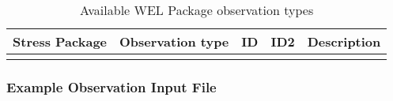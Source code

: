 \begin{longtable}{p{2cm} p{2.75cm} p{2cm} p{1.25cm} p{7cm}}
\caption{Available WEL Package observation types} \tabularnewline

\hline
\hline
\textbf{Stress Package} & \textbf{Observation type} & \textbf{ID} & \textbf{ID2} & \textbf{Description} \\
\hline
\endhead

\hline
\endfoot


\label{table:gwf-welobstype}
\end{longtable}

\vspace{5mm}
\subsubsection{Example Observation Input File}

